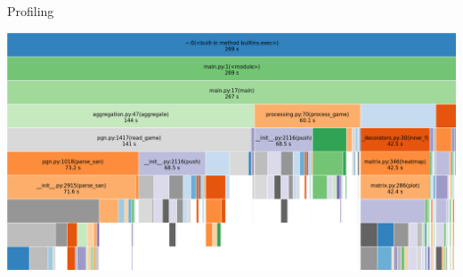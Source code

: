 \documentclass[presentation, 8pt]{beamer}
\begin{document}
\begin{frame}[label={sec:orge448228}]{Profiling}
\begin{center}
\includegraphics[width=.9\linewidth]{Images/Profiling.png}
\end{center}
\end{frame}
\end{document}
